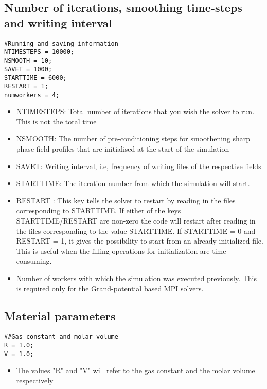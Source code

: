\documentclass[a4paper,10pt]{article}
\begin{document}
\subsection{Number of iterations, smoothing time-steps and writing interval}

\begin{lstlisting}
#Running and saving information
NTIMESTEPS = 10000;
NSMOOTH = 10;
SAVET = 1000;
STARTTIME = 6000;
RESTART = 1;
numworkers = 4;
\end{lstlisting}

\begin{itemize}
 \item NTIMESTEPS: Total number of iterations that you wish the solver to run. This is not the total time
 \item NSMOOTH: The number of pre-conditioning steps for smoothening sharp phase-field profiles that are initialised at the start of the simulation
 \item SAVET: Writing interval, i.e, frequency of writing files of the respective fields
 \item STARTTIME: The iteration number from which the simulation will start.
 \item RESTART : This key tells the solver to restart by reading in the files corresponding to STARTTIME. If either of the keys STARTTIME/RESTART are non-zero
 the code will restart after reading in the files corresponding to the value STARTTIME. If STARTTIME = 0 and RESTART = 1, it gives the possibility to start from 
 an already initialized file. This is useful when the filling operations for initialization are time-consuming.
 \item Number of workers with which the simulation was executed previously. This is required only for the Grand-potential based MPI solvers.
\end{itemize}

\subsection{Material parameters}

\begin{lstlisting}
##Gas constant and molar volume
R = 1.0;
V = 1.0;
\end{lstlisting}

\begin{itemize}
 \item The values "R" and "V" will refer to the gas constant and the molar volume respectively 
\end{itemize}
\end{document}
